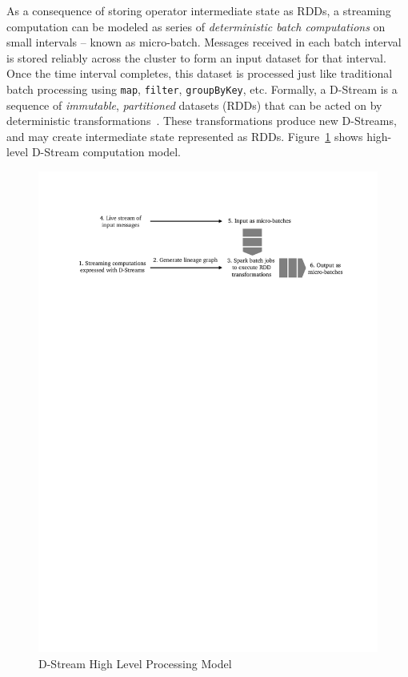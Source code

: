 As a consequence of storing operator intermediate state as RDDs, a streaming computation can be modeled as series of \emph{deterministic batch computations} on small intervals -- known as micro-batch. Messages received in each batch interval is stored reliably across the cluster to form an input dataset for that interval. Once the time interval completes, this dataset is processed just like traditional batch processing using \lstinline$map$, \lstinline$filter$, \lstinline$groupByKey$, etc. Formally, a D-Stream is a sequence of \emph{immutable}, \emph{partitioned} datasets (RDDs) that can be acted on by deterministic transformations~\cite{Zaharia:2013}. These  transformations produce new D-Streams, and may create intermediate state represented as RDDs. Figure~\ref{fig:sp:dstream-high} shows high-level D-Stream computation model.
\begin{figure}[hb]
    \centering
    \includegraphics[clip,trim=2.1cm 23cm 2cm 2.6cm]{dstream-high.pdf}
    \caption{D-Stream High Level Processing Model}
    \label{fig:sp:dstream-high}
\end{figure}

